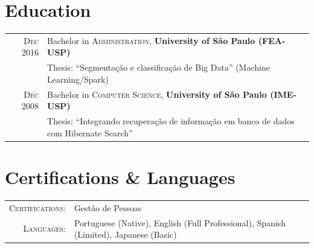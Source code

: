 \documentclass[a4paper,10pt]{article}
\begin{document}
\section{Education}
\begin{tabular}{rl} 
 \textsc{Dec} 2016 & Bachelor in \textsc{Administration}, \textbf{University of São Paulo (FEA-USP)}\\
&Thesis: ``Segmentação e classificação de Big Data'' (Machine Learning/Spark)\\
\textsc{Dec} 2008& Bachelor in \textsc{Computer Science}, \textbf{University of São Paulo (IME-USP)}\\
& Thesis: ``Integrando recuperação de informação em banco de dados com Hibernate Search''\\
\end{tabular}

\section{Certifications \& Languages}
\begin{tabular}{rl}
 \textsc{Certifications:} & Gestão de Pessoas\\
 \textsc{Languages:} & Portuguese (Native), English (Full Professional), Spanish (Limited), Japanese (Basic)\\
\end{tabular}
\end{document}
